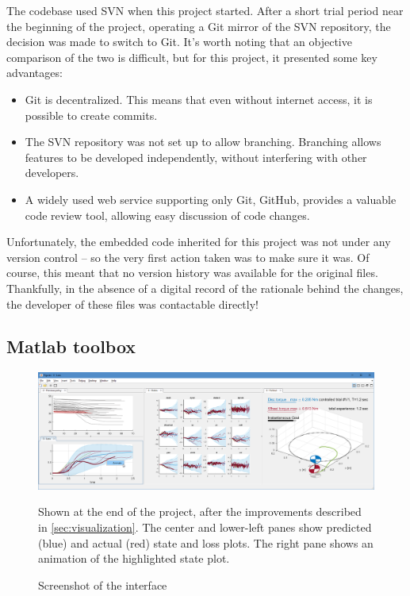 \documentclass[main.tex]{subfiles}
\begin{document}
	The {\Pilco} codebase used SVN when this project started. After a short trial period near the beginning of the project, operating a Git mirror of the SVN repository, the decision was made to switch to Git. It's worth noting that an objective comparison of the two is difficult, but for this project, it presented some key advantages:
	\begin{itemize}
		\item
			Git is decentralized. This means that even without internet access, it is possible to create commits.

		\item
			The SVN repository was not set up to allow branching. Branching allows features to be developed independently, without interfering with other developers.

		\item
			A widely used web service supporting only Git, GitHub, provides a valuable code review tool, allowing easy discussion of code changes.
	\end{itemize}

	Unfortunately, the embedded code inherited for this project was not under any version control -- so the very first action taken was to make sure it was.
	Of course, this meant that no version history was available for the original files. Thankfully, in the absence of a digital record of the rationale behind the changes, the developer of these files was contactable directly!

	\subsection{Matlab toolbox}

	\begin{figure}[b!]
		\centering
		\includegraphics[width=\linewidth]{figures/pilco.png}
		\caption{Screenshot of the {\Pilco} interface}
		\label{fig:pilco-interface}
		\medskip
		\small
		Shown at the end of the project, after the improvements described in \cref{sec:visualization}.
		The center and lower-left panes show predicted (blue) and actual (red) state and loss plots.
		The right pane shows an animation of the highlighted state plot.
	\end{figure}
\end{document}
